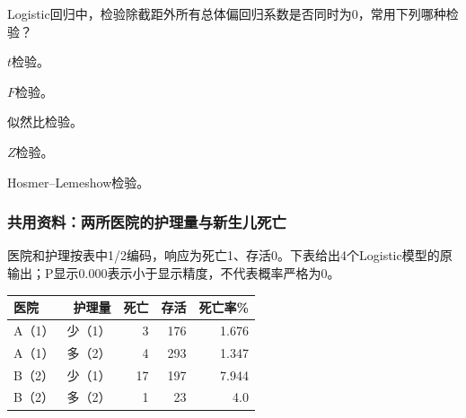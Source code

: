 \par\addvspace{8pt}\noindent\begin{minipage}{\linewidth}


Logistic回归中，检验除截距外所有总体偏回归系数是否同时为0，常用下列哪种检验？


\begin{choices}

\item \(t\)检验。

\item \(F\)检验。

\item 似然比检验。

\item \(Z\)检验。

\item Hosmer--Lemeshow检验。

\end{choices}

\end{minipage}\par\vspace{5pt}

\subsubsection*{共用资料：两所医院的护理量与新生儿死亡}

医院和护理按表中1/2编码，响应为死亡1、存活0。下表给出4个Logistic模型的原输出；P显示0.000表示小于显示精度，不代表概率严格为0。

\begin{center}\small\setlength{\tabcolsep}{3.5pt}\renewcommand{\arraystretch}{1.18}\begin{tabular}{@{}lrrrr@{}}
\toprule
医院 & 护理量 & 死亡 & 存活 & 死亡率\% \\
\midrule

A（1） & 少（1） & 3 & 176 & 1.676 \\
A（1） & 多（2） & 4 & 293 & 1.347 \\
B（2） & 少（1） & 17 & 197 & 7.944 \\
B（2） & 多（2） & 1 & 23 & 4.0 \\
\bottomrule\end{tabular}\end{center}

